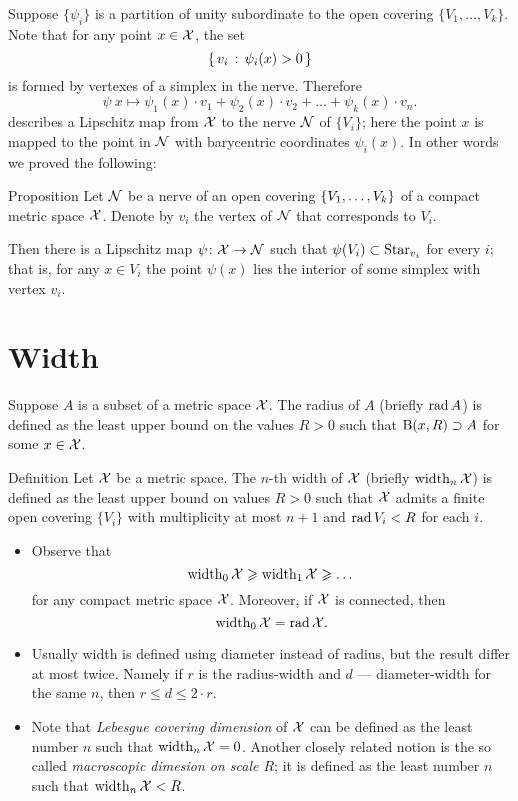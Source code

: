 Suppose $\{\psi_i\}$ is  
a partition of unity subordinate to the open covering $\{V_1,\dots,V_k\}$.
Note that for any point $x\in {\mathcal{X}}$, the set
$$\left\{\,{v_i}\,:\,{\psi_i(x)>0}\,\right\}$$
is formed by vertexes of a simplex in the nerve.
Therefore 
$$\psi\:x\mapsto \psi_1(x)\cdot v_1+\psi_2(x)\cdot v_2+\dots+\psi_k(x)\cdot v_n.$$
describes a Lipschitz map from ${\mathcal{X}}$ to the nerve $\mathcal{N}$ of $\{V_i\}$;
here the point $x$ is mapped to the point in $\mathcal{N}$ with barycentric coordinates $\psi_i(x)$.
In other words we proved the following:

\begin{thm}{Proposition}\label{prop:space->nerve}
Let $\mathcal{N}$ be a nerve of an open covering $\{V_1,\z\dots,V_k\}$ of a compact metric space $\mathcal{X}$.
Denote by $v_i$ the vertex of $\mathcal{N}$ that corresponds to $V_i$.

Then there is a Lipschitz map $\psi\colon\mathcal{X}\to\mathcal{N}$ such that $\psi(V_i)\z\subset\Star_{v_i}$ for every $i$;
that is, for any $x\in V_i$ the point $\psi(x)$ lies the interior of some simplex with vertex $v_i$.\index{$\Star$}
\end{thm}


\section{Width}

Suppose $A$ is a subset of a metric space $\mathcal{X}$.
The radius of $A$ (briefly $\mathop{\rm rad}\nolimits A$) is defined as the least upper bound on the values $R>0$ such that $\mathrm{B}{}(x,R)\supset A$ for some $x\in \mathcal{X}$.

\begin{thm}{Definition}\label{def:width}
Let $\mathcal{X}$ be a metric space.
The $n$-th width of $\mathcal{X}$ (briefly $\operatorname{\rm width}\nolimits_n\mathcal{X}$) is defined as the least upper bound on values $R>0$ such that $\mathcal{X}$ admits a finite open covering $\{V_i\}$ with multiplicity at most $n+1$ and $\mathop{\rm rad}\nolimits V_i< R$ for each $i$.
\end{thm}

\begin{itemize}
\item Observe that 
\[\operatorname{\rm width}\nolimits_0\mathcal{X}\geqslant\operatorname{\rm width}\nolimits_1\mathcal{X}\geqslant\dots\]
for any compact metric space $\mathcal{X}$.
Moreover, if $\mathcal{X}$ is connected, then 
\[\operatorname{\rm width}\nolimits_0\mathcal{X}=\mathop{\rm rad}\nolimits\mathcal{X}.\]
\item 
Usually width is defined using diameter instead of radius, but the result differ at most twice.
Namely if $r$ is the radius-width and $d$ --- diameter-width for the same $n$, then 
$r\le d\le 2\cdot r$.

\item Note that \emph{Lebesgue covering dimension} of $\mathcal{X}$ can be defined as the least number $n$ such that $\operatorname{\rm width}\nolimits_n\mathcal{X}=0$.
Another closely related notion is the so called \emph{macroscopic dimesion on scale $R$};
it is defined as the  least number $n$ such that $\operatorname{\rm width}\nolimits_n\mathcal{X}<R$.
\end{itemize}

